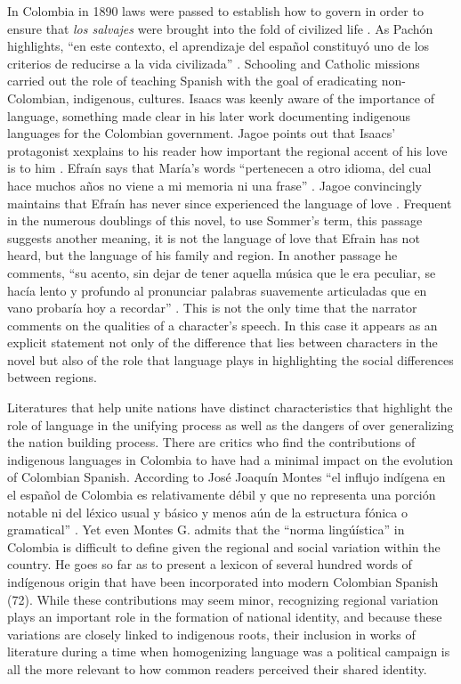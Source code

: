 \documentclass[12pt]{report}\usepackage[]{graphicx}\usepackage[]{color}
\begin{document}
\begin{spacing}{1.9}
In Colombia in 1890 laws were passed to establish how to govern in order to ensure that \textit{los salvajes} were brought into the fold of civilized life \autocite[158]{Montes1997}. 
As Pachón highlights, \enquote{en este contexto, el aprendizaje del español constituyó uno de los criterios de reducirse a la vida civilizada} \autocite[158]{Montes1997}. 
Schooling and Catholic missions carried out the role of teaching Spanish with the goal of eradicating non-Colombian, indigenous, cultures. 
Isaacs was keenly aware of the importance of language, something made clear in his later work documenting indigenous languages for the Colombian government.
Jagoe points out that Isaacs' protagonist xexplains to his reader how important the regional accent of his love is to him \autocite[153]{Jagoe2003}.
Efraín says that María’s words \enquote{pertenecen a otro idioma, del cual hace muchos años no viene a mi memoria ni una frase} \autocite[78]{Isaacs2012}.
Jagoe convincingly maintains that Efraín has never since experienced the language of love \autocite[153]{Jagoe2003}.
Frequent in the numerous doublings of this novel, to use Sommer's term, this passage suggests another meaning, it is not the language of love that Efrain has not heard, but the language of his family and region.
In another passage he comments, \enquote{su acento, sin dejar de tener aquella música que le era peculiar, se hacía lento y profundo al pronunciar palabras suavemente articuladas que en vano probaría hoy a recordar} \autocite[78]{Isaacs2012}.
This is not the only time that the narrator comments on the qualities of a character's speech.
In this case it appears as an explicit statement not only of the difference that lies between characters in the novel but also of the role that language plays in highlighting the social differences between regions.

Literatures that help unite nations have distinct characteristics that highlight the role of language in the unifying process as well as the dangers of over generalizing the nation building process. 
There are critics who find the contributions of indigenous languages in Colombia to have had a minimal impact on the evolution of Colombian Spanish. 
According to José Joaquín Montes \enquote{el influjo indígena en el español de Colombia es relativamente débil y que no representa una porción notable ni del léxico usual y básico y menos aún de la estructura fónica o gramatical} \autocite[72]{Montes1997}. 
Yet even Montes G. admits that the \enquote{norma lingúística} in Colombia is difficult to define given the regional and social variation within the country. 
He goes so far as to present a lexicon of several hundred words of indígenous origin that have been incorporated into modern Colombian Spanish (72). 
While these contributions may seem minor, recognizing regional variation plays an important role in the formation of national identity, and because these variations are closely linked to indigenous roots, their inclusion in works of literature during a time when homogenizing language was a political campaign is all the more relevant to how common readers perceived their shared identity. 


\end{spacing}
\end{document}
